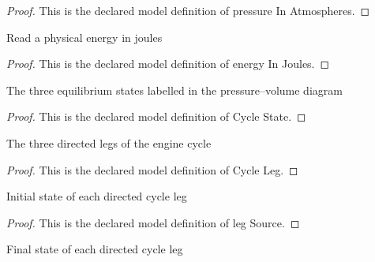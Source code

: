 \begin{proof}
  This is the declared model definition of pressure In Atmospheres.
\end{proof}
\begin{definition}
  \label{def:physics:phyx-mini-0348:phyxminiproblems-problemphyxmini0348-energyinjoules}
  Read a physical energy in joules
\end{definition}
\begin{proof}
  This is the declared model definition of energy In Joules.
\end{proof}
\begin{definition}
  \label{def:physics:phyx-mini-0348:phyxminiproblems-problemphyxmini0348-cyclestate}
  The three equilibrium states labelled in the pressure--volume diagram
\end{definition}
\begin{proof}
  This is the declared model definition of Cycle State.
\end{proof}
\begin{definition}
  \label{def:physics:phyx-mini-0348:phyxminiproblems-problemphyxmini0348-cycleleg}
  The three directed legs of the engine cycle
\end{definition}
\begin{proof}
  This is the declared model definition of Cycle Leg.
\end{proof}
\begin{definition}
  \label{def:physics:phyx-mini-0348:phyxminiproblems-problemphyxmini0348-legsource}
  Initial state of each directed cycle leg
\end{definition}
\begin{proof}
  This is the declared model definition of leg Source.
\end{proof}
\begin{definition}
  \label{def:physics:phyx-mini-0348:phyxminiproblems-problemphyxmini0348-legtarget}
  Final state of each directed cycle leg
\end{definition}
